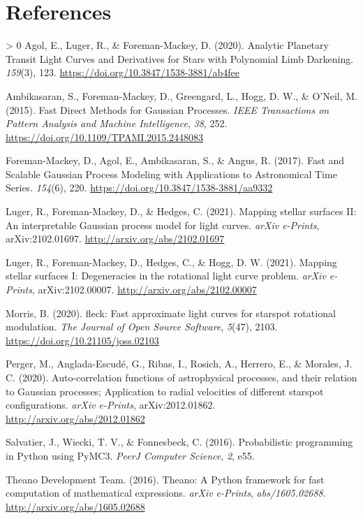\documentclass[10pt,a4paper,onecolumn]{article}
\let\textttOrig=\texttt
\def\texttt#1{\expandafter\textttOrig{\seqsplit{#1}}}
\newlength{\cslhangindent}
\newenvironment{CSLReferences}[3] %
 {%
  \setlength{\parindent}{0pt}
  \ifodd #1 \everypar{\setlength{\hangindent}{\cslhangindent}}\ignorespaces\fi
  \ifnum #2 > 0
  \setlength{\parskip}{#2\baselineskip}
  \fi
 }%
 {}
\let\addcontentslineOrig=\addcontentsline
\def\addcontentsline#1#2#3{\bgroup
  \let\texttt=\textttOrig\addcontentslineOrig{#1}{#2}{#3}\egroup}
\begin{document}
\hypertarget{references}{%
\section*{References}\label{references}}

\hypertarget{refs}{}
\begin{CSLReferences}{1}{0}
\leavevmode\hypertarget{ref-Agol2020}{}%
Agol, E., Luger, R., \& Foreman-Mackey, D. (2020). {Analytic Planetary
Transit Light Curves and Derivatives for Stars with Polynomial Limb
Darkening}. \emph{159}(3), 123.
\url{https://doi.org/10.3847/1538-3881/ab4fee}

\leavevmode\hypertarget{ref-Ambikasaran2015}{}%
Ambikasaran, S., Foreman-Mackey, D., Greengard, L., Hogg, D. W., \&
O'Neil, M. (2015). {Fast Direct Methods for Gaussian Processes}.
\emph{IEEE Transactions on Pattern Analysis and Machine Intelligence},
\emph{38}, 252. \url{https://doi.org/10.1109/TPAMI.2015.2448083}

\leavevmode\hypertarget{ref-ForemanMackey2017}{}%
Foreman-Mackey, D., Agol, E., Ambikasaran, S., \& Angus, R. (2017).
{Fast and Scalable Gaussian Process Modeling with Applications to
Astronomical Time Series}. \emph{154}(6), 220.
\url{https://doi.org/10.3847/1538-3881/aa9332}

\leavevmode\hypertarget{ref-PaperII}{}%
Luger, R., Foreman-Mackey, D., \& Hedges, C. (2021). {Mapping stellar
surfaces II: An interpretable Gaussian process model for light curves}.
\emph{arXiv e-Prints}, arXiv:2102.01697.
\url{http://arxiv.org/abs/2102.01697}

\leavevmode\hypertarget{ref-PaperI}{}%
Luger, R., Foreman-Mackey, D., Hedges, C., \& Hogg, D. W. (2021).
{Mapping stellar surfaces I: Degeneracies in the rotational light curve
problem}. \emph{arXiv e-Prints}, arXiv:2102.00007.
\url{http://arxiv.org/abs/2102.00007}

\leavevmode\hypertarget{ref-Morris2020b}{}%
Morris, B. (2020). {fleck: Fast approximate light curves for starspot
rotational modulation}. \emph{The Journal of Open Source Software},
\emph{5}(47), 2103. \url{https://doi.org/10.21105/joss.02103}

\leavevmode\hypertarget{ref-Perger2020}{}%
Perger, M., Anglada-Escudé, G., Ribas, I., Rosich, A., Herrero, E., \&
Morales, J. C. (2020). {Auto-correlation functions of astrophysical
processes, and their relation to Gaussian processes; Application to
radial velocities of different starspot configurations}. \emph{arXiv
e-Prints}, arXiv:2012.01862. \url{http://arxiv.org/abs/2012.01862}

\leavevmode\hypertarget{ref-Salvatier2016}{}%
Salvatier, J., Wiecki, T. V., \& Fonnesbeck, C. (2016). {Probabilistic
programming in Python using PyMC3}. \emph{PeerJ Computer Science},
\emph{2}, e55.

\leavevmode\hypertarget{ref-Theano2016}{}%
Theano Development Team. (2016). {Theano: A {Python} framework for fast
computation of mathematical expressions}. \emph{arXiv e-Prints},
\emph{abs/1605.02688}. \url{http://arxiv.org/abs/1605.02688}

\end{CSLReferences}
\end{document}
